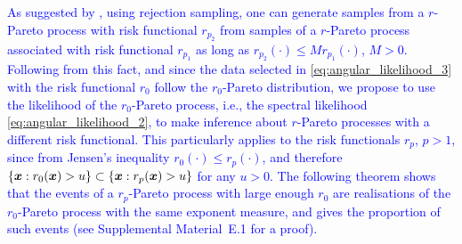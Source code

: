 \documentclass[12pt]{article}
\newcommand{\PZ}{\textcolor{blue}}
\begin{document}

\PZ{As suggested by \citet[Proposition 2]{Dombry.etal:2024}, using rejection sampling, one can generate samples from a $r$-Pareto process with risk functional $r_{p_2}$ from samples of a $r$-Pareto process associated with risk functional $r_{p_1}$ as long as $r_{p_2}(\cdot)\leq M r_{p_1}(\cdot)$, $M>0$. 
Following from this fact, and since the data selected in \eqref{eq:angular_likelihood_3} with the risk functional $r_0$ follow the $r_0$-Pareto distribution, we propose to use the likelihood of the $r_0$-Pareto process, i.e., the spectral likelihood \eqref{eq:angular_likelihood_2}, to make inference about $r$-Pareto processes with a different risk functional. 
This particularly applies to the risk functionals $r_p$, $p>1$, since from Jensen's inequality $r_0(\cdot)\leq r_p(\cdot)$, and therefore $\{{\boldsymbol{x}}: r_0({\boldsymbol{x}})>u\}\subset\{{\boldsymbol{x}}: r_p({\boldsymbol{x}})>u\}$ for any $u>0$.
The following theorem shows that the events of a $r_p$-Pareto process with large enough $r_0$ are realisations of the $r_0$-Pareto process with the same exponent measure, and gives the proportion of such events (see Supplemental Material~E.1 for a proof).}
\end{document}
